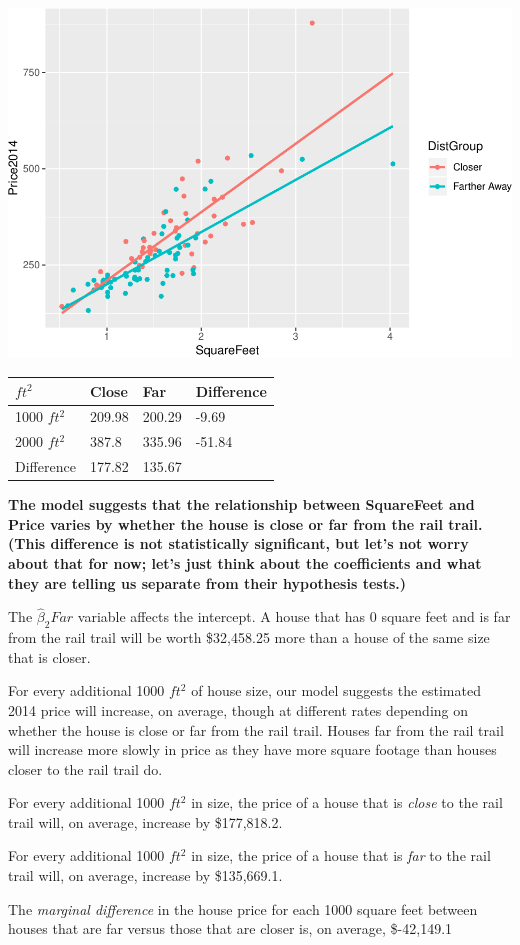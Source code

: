 \documentclass[]{article}
\begin{document}
\includegraphics{09_InClass_Answers_files/figure-latex/unnamed-chunk-22-1.pdf}

\vspace{0.5 in}

\begin{longtable}[]{@{}llll@{}}
\toprule
\(ft^2\) & Close & Far & Difference\tabularnewline
\midrule
\endhead
1000 \(ft^2\) & 209.98 & 200.29 & -9.69\tabularnewline
2000 \(ft^2\) & 387.8 & 335.96 & -51.84\tabularnewline
Difference & 177.82 & 135.67 &\tabularnewline
\bottomrule
\end{longtable}

\textbf{The model suggests that the relationship between SquareFeet and
Price varies by whether the house is close or far from the rail trail.
(This difference is not statistically significant, but let's not worry
about that for now; let's just think about the coefficients and what
they are telling us separate from their hypothesis tests.)}

The \(\hat{\beta}_2 Far\) variable affects the intercept. A house that
has 0 square feet and is far from the rail trail will be worth
\$32,458.25 more than a house of the same size that is closer.

For every additional 1000 \(ft^2\) of house size, our model suggests the
estimated 2014 price will increase, on average, though at different
rates depending on whether the house is close or far from the rail
trail. Houses far from the rail trail will increase more slowly in price
as they have more square footage than houses closer to the rail trail
do.

For every additional 1000 \(ft^2\) in size, the price of a house that is
\emph{close} to the rail trail will, on average, increase by
\$177,818.2.

For every additional 1000 \(ft^2\) in size, the price of a house that is
\emph{far} to the rail trail will, on average, increase by \$135,669.1.

The \emph{marginal difference} in the house price for each 1000 square
feet between houses that are far versus those that are closer is, on
average, \$-42,149.1
\end{document}
